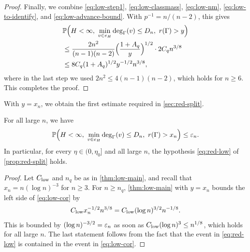 \begin{proof}
Finally, we combine \eqref{eq:low-step1}, \eqref{eq:low-classmass}, \eqref{eq:low-nm}, \eqref{eq:low-to-identify}, and \eqref{eq:low-advance-bound}. With $p^{-1} = n/(n - 2)$, this gives
\begin{equation*}
\begin{aligned}
&\mathbb P\Bigl(H < \infty, \ \min_{v \in e_H} \deg_\Gamma(v) \le D_n, \ r(\Gamma) > y\Bigr) \\
&\le \frac{2n^2}{(n - 1)(n - 2)} \Bigl(\frac{1 + A_q}{y}\Bigr)^{1/2} \cdot 2 C_q n^{3/8} \\
&\le 8 C_q (1 + A_q)^{1/2} y^{-1/2} n^{3/8},
\end{aligned}
\end{equation*}
where in the last step we used $2n^2 \le 4(n - 1)(n - 2)$, which holds for $n \ge 6$. This completes the proof.
\end{proof}

With $y = x_n$, we obtain the first estimate required in \cref{sec:red-split}.

\begin{corollary}\label{cor:low}
For all large $n$, we have
\begin{equation}\label{eq:low-cor}
\Pp\Bigl(H < \infty, \ \min_{v \in e_H} \deg_\Gamma(v) \le D_n, \ r(\Gamma) > x_n\Bigr) \le \eps_n.
\end{equation}
In particular, for every $\eta \in (0, \eta_0]$ and all large $n$, the hypothesis \eqref{eq:red-low} of \cref{prop:red-split} holds.
\end{corollary}

\begin{proof}
Let $C_{\rm low}$ and $n_q$ be as in \cref{thm:low-main}, and recall that $x_n = n (\log n)^{-3}$ for $n \ge 3$. For $n \ge n_q$, \cref{thm:low-main} with $y = x_n$ bounds the left side of \eqref{eq:low-cor} by
\begin{equation*}
C_{\rm low} x_n^{-1/2} n^{3/8} = C_{\rm low} (\log n)^{3/2} n^{-1/8}.
\end{equation*}
This is bounded by $(\log n)^{-3/2} = \varepsilon_n$ as soon as $C_{\rm low} (\log n)^3 \le n^{1/8}$, which holds for all large $n$. The last statement follows from the fact that the event in \eqref{eq:red-low} is contained in the event in \eqref{eq:low-cor}.
\end{proof}

